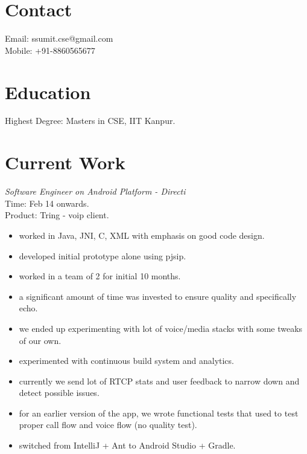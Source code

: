 \documentclass[margin,line]{resume}
\begin{document}
\begin{resume}

    \section{\mysidestyle Contact}
    	Email: ssumit.cse@gmail.com\\
    	Mobile: +91-8860565677\\
    \section{\mysidestyle Education}
	Highest Degree: Masters in CSE, IIT Kanpur.

    \section{\mysidestyle Current Work}

\textit{Software Engineer on Android Platform - Directi} \\
Time: Feb 14 onwards.\\
Product: Tring - voip client.\\
\begin{itemize}
	\item worked in Java, JNI, C, XML with emphasis on good code design.
        \item developed initial prototype alone using pjsip.
        \item worked in a team of 2 for initial 10 months.
	\item a significant amount of time was invested to ensure quality and specifically echo.
	\item we ended up experimenting with lot of voice/media stacks with some tweaks of our own.
	\item experimented with continuous build system and analytics.
	\item currently we send lot of RTCP stats and user feedback to narrow down and detect possible issues.
	\item for an earlier version of the app, we wrote functional tests that used to test proper call flow and voice flow (no quality test). 
	\item switched from IntelliJ + Ant to Android Studio + Gradle. 
 \end{itemize}


\end{resume}
\end{document}
